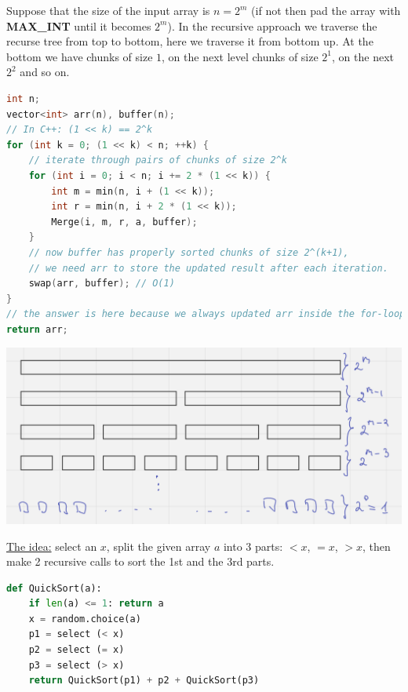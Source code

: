 
Suppose that the size of the input array is $n = 2^m$ (if not then pad the array with \textbf{MAX\_INT} until it becomes $2^m$). In the recursive approach we traverse the recurse tree from top to bottom, here we traverse it from bottom up. At the bottom we have chunks of size $1$, on the next level chunks of size $2^1$, on the next $2^2$ and so on.

\begin{lstlisting}[language=C++]
int n;
vector<int> arr(n), buffer(n);
// In C++: (1 << k) == 2^k
for (int k = 0; (1 << k) < n; ++k) {
    // iterate through pairs of chunks of size 2^k
    for (int i = 0; i < n; i += 2 * (1 << k)) {
        int m = min(n, i + (1 << k));
        int r = min(n, i + 2 * (1 << k));
        Merge(i, m, r, a, buffer);
    }
    // now buffer has properly sorted chunks of size 2^(k+1),
    // we need arr to store the updated result after each iteration.
    swap(arr, buffer); // O(1)
}
// the answer is here because we always updated arr inside the for-loop
return arr;

\end{lstlisting}

\begin{center}
    \includegraphics[scale=0.6]{./assets/13-sorting-algorithms/1.PNG}
\end{center}


\underline{The idea:} select an $x$, split the given array $a$ into 3 parts: $<x$, $=x$, $>x$, then make 2 recursive calls to sort the 1st and the 3rd parts.

\begin{lstlisting}[language=Python]
def QuickSort(a):
    if len(a) <= 1: return a
    x = random.choice(a)
    p1 = select (< x)
    p2 = select (= x)
    p3 = select (> x)
    return QuickSort(p1) + p2 + QuickSort(p3)
\end{lstlisting}

